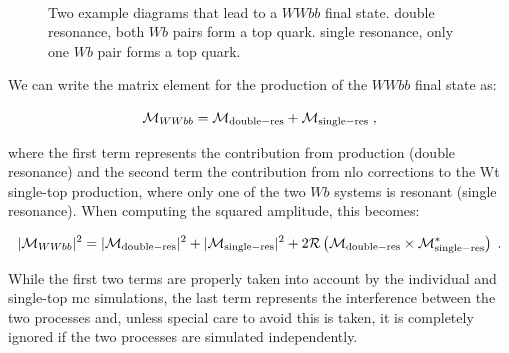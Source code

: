 \begin{figure}[h]
\centering 
{}$\;\;\;\;\;\;$
\caption{Two example diagrams that lead to a $WWbb$ final state.  double resonance, both $Wb$ pairs form a top quark.  single resonance, only one $Wb$ pair forms a top quark.}\label{fig:WWbb_int}
\end{figure}


We can write the matrix element for the production of the $WWbb$ final state as:

\begin{equation}
\mathcal{M}_{WWbb} = \mathcal{M}_{\rm{double-res}} + \mathcal{M}_{\rm{single-res}} \; , \nonumber
\end{equation}

\noindent where the first term represents the contribution from \ttbar production (double resonance) and the second term the contribution from 
\gls{nlo} corrections to the Wt single-top production, where only one of the two $Wb$ systems is resonant (single resonance). 
When computing the squared amplitude, this becomes:

\begin{equation}
|\mathcal{M}_{WWbb}|^2 = |\mathcal{M}_{\rm{double-res}}|^2 + |\mathcal{M}_{\rm{single-res}}|^2 + 2 \mathcal{R}\left(\mathcal{M}_{\rm{double-res}}\times \mathcal{M}_{\rm{single-res}}^* \right) \; . \nonumber
\end{equation}

While the first two terms are properly taken into account by the individual \ttbar and single-top \gls{mc} simulations, 
the last term represents the interference between the two processes and, unless special care to avoid this is taken, it is completely ignored if the two processes are simulated independently. 

